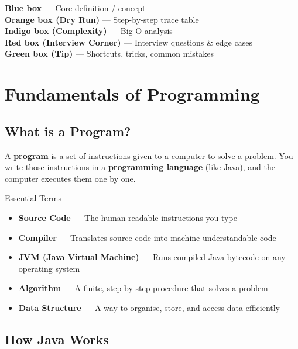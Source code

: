 \documentclass[12pt,a4paper,oneside]{book}
\begin{document}
\begin{warningbox}
\textbf{Blue box} --- Core definition / concept\\
\textbf{Orange box (Dry Run)} --- Step-by-step trace table\\
\textbf{Indigo box (Complexity)} --- Big-O analysis\\
\textbf{Red box (Interview Corner)} --- Interview questions \& edge cases\\
\textbf{Green box (Tip)} --- Shortcuts, tricks, common mistakes
\end{warningbox}

\mainmatter

\chapter{Fundamentals of Programming}

\section{What is a Program?}

A \textbf{program} is a set of instructions given to a computer to solve a problem. You write those instructions in a \textbf{programming language} (like Java), and the computer executes them one by one.

\begin{definitionbox}{Essential Terms}
\begin{itemize}
  \item \textbf{Source Code} --- The human-readable instructions you type
  \item \textbf{Compiler} --- Translates source code into machine-understandable code
  \item \textbf{JVM (Java Virtual Machine)} --- Runs compiled Java bytecode on any operating system
  \item \textbf{Algorithm} --- A finite, step-by-step procedure that solves a problem
  \item \textbf{Data Structure} --- A way to organise, store, and access data efficiently
\end{itemize}
\end{definitionbox}

\section{How Java Works}
\end{document}
